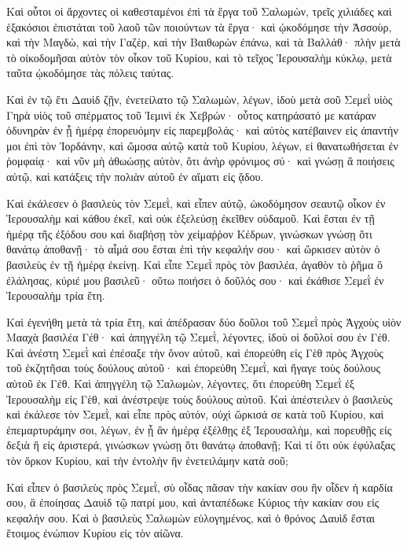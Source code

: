 {Καὶ οὗτοι οἱ ἄρχοντες οἱ καθεσταμένοι ἐπὶ τὰ ἔργα τοῦ Σαλωμὼν, τρεῖς χιλιάδες καὶ ἑξακόσιοι ἐπιστάται τοῦ λαοῦ τῶν ποιούντων τὰ ἔργα·
καὶ ᾠκοδόμησε τὴν Ἀσσοὺρ, καὶ τὴν Μαγδὼ, καὶ τὴν Γαζὲρ, καὶ τὴν Βαιθωρὼν ἐπάνω, καὶ τὰ Βαλλάθ·
πλὴν μετὰ τὸ οἰκοδομῆσαι αὐτὸν τὸν οἶκον τοῦ Κυρίου, καὶ τὸ τεῖχος Ἱερουσαλὴμ κύκλῳ, μετὰ ταῦτα ᾠκοδόμησε τὰς πόλεις ταύτας.
\par }{\PP {}Καὶ ἐν τῷ ἔτι Δαυὶδ ζῇν, ἐνετείλατο τῷ Σαλωμὼν, λέγων, ἰδοὺ μετὰ σοῦ Σεμεῒ υἱὸς Γηρὰ υἱὸς τοῦ σπέρματος τοῦ Ἰεμινὶ ἐκ Χεβρών·
οὗτος κατηράσατό με κατάραν ὀδυνηρὰν ἐν ᾗ ἡμέρᾳ ἐπορευόμην εἰς παρεμβολάς·
καὶ αὐτὸς κατέβαινεν εἰς ἀπαντήν μοι ἐπὶ τὸν Ἰορδάνην, καὶ ὤμοσα αὐτῷ κατὰ τοῦ Κυρίου, λέγων, εἰ θανατωθήσεται ἐν ῥομφαίᾳ·
καὶ νῦν μὴ ἀθωώσῃς αὐτὸν, ὅτι ἀνὴρ φρόνιμος σύ· καὶ γνώσῃ ἃ ποιήσεις αὐτῷ, καὶ κατάξεις τὴν πολιὰν αὐτοῦ ἐν αἵματι εἰς ᾅδου.
\par }{\PP {}Καὶ ἐκάλεσεν ὁ βασιλεὺς τὸν Σεμεῒ, καὶ εἶπεν αὐτῷ, ὠκοδόμησον σεαυτῷ οἶκον ἐν Ἱερουσαλὴμ καὶ κάθου ἐκεῖ, καὶ οὐκ ἐξελεύσῃ ἐκεῖθεν οὐδαμοῦ.
Καὶ ἔσται ἐν τῇ ἡμέρᾳ τῆς ἐξόδου σου καὶ διαβήσῃ τὸν χείμαῤῥον Κέδρων, γινώσκων γνώσῃ ὅτι θανάτῳ ἀποθανῇ· τὸ αἷμά σου ἔσται ἐπὶ τὴν κεφαλήν σου· καὶ ὥρκισεν αὐτὸν ὁ βασιλεὺς ἐν τῇ ἡμέρᾳ ἐκείνῃ.
Καὶ εἶπε Σεμεῒ πρὸς τὸν βασιλέα, ἀγαθὸν τὸ ῥῆμα ὃ ἐλάλησας, κύριέ μου βασιλεῦ· οὕτω ποιήσει ὁ δοῦλός σου· καὶ ἐκάθισε Σεμεῒ ἐν Ἱερουσαλὴμ τρία ἔτη.
\par }{\PP {}Καὶ ἐγενήθη μετὰ τὰ τρία ἔτη, καὶ ἀπέδρασαν δύο δοῦλοι τοῦ Σεμεῒ πρὸς Ἀγχοὺς υἱὸν Μααχὰ βασιλέα Γέθ· καὶ ἀπηγγέλη τῷ Σεμεῒ, λέγοντες, ἰδοὺ οἱ δοῦλοί σου ἐν Γέθ.
Καὶ ἀνέστη Σεμεῒ καὶ ἐπέσαξε τὴν ὄνον αὐτοῦ, καὶ ἐπορεύθη εἰς Γὲθ πρὸς Ἀγχοὺς τοῦ ἐκζητῆσαι τοὺς δούλους αὐτοῦ· καὶ ἐπορεύθη Σεμεῒ, καὶ ἤγαγε τοὺς δούλους αὐτοῦ ἐκ Γέθ.
Καὶ ἀπηγγέλη τῷ Σαλωμὼν, λέγοντες, ὅτι ἐπορεύθη Σεμεῒ ἐξ Ἱερουσαλὴμ εἰς Γὲθ, καὶ ἀνέστρεψε τοὺς δούλους αὐτοῦ.
Καὶ ἀπέστειλεν ὁ βασιλεὺς καὶ ἐκάλεσε τὸν Σεμεῒ, καὶ εἶπε πρὸς αὐτόν, οὐχὶ ὥρκισά σε κατὰ τοῦ Κυρίου, καὶ ἐπεμαρτυράμην σοι, λέγων, ἐν ᾗ ἂν ἡμέρᾳ ἐξέλθῃς ἐξ Ἱερουσαλὴμ, καὶ πορευθῇς εἰς δεξιὰ ἢ εἰς ἀριστερά, γινώσκων γνώσῃ ὅτι θανάτῳ ἀποθανῇ;
Καὶ τί ὅτι οὐκ ἐφύλαξας τὸν ὅρκον Κυρίου, καὶ τὴν ἐντολὴν ἣν ἐνετειλάμην κατὰ σοῦ;
\par }{\PP {}Καὶ εἶπεν ὁ βασιλεὺς πρὸς Σεμεῒ, σὺ οἶδας πᾶσαν τὴν κακίαν σου ἣν οἶδεν ἡ καρδία σου, ἃ ἐποίησας Δαυὶδ τῷ πατρί μου, καὶ ἀνταπέδωκε Κύριος τὴν κακίαν σου εἰς κεφαλήν σου.
Καὶ ὁ βασιλεὺς Σαλωμὼν εὐλογημένος, καὶ ὁ θρόνος Δαυὶδ ἔσται ἕτοιμος ἐνώπιον Κυρίου εἰς τὸν αἰῶνα.
}
